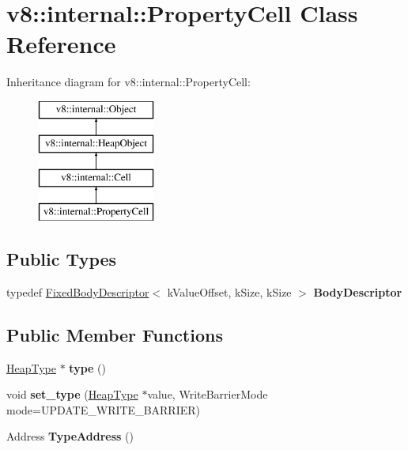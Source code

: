 \hypertarget{classv8_1_1internal_1_1_property_cell}{}\section{v8\+:\+:internal\+:\+:Property\+Cell Class Reference}
\label{classv8_1_1internal_1_1_property_cell}
Inheritance diagram for v8\+:\+:internal\+:\+:Property\+Cell\+:\begin{figure}[H]
\begin{center}
\leavevmode
\includegraphics[height=4.000000cm]{classv8_1_1internal_1_1_property_cell}
\end{center}
\end{figure}
\subsection*{Public Types}
\begin{DoxyCompactItemize}
\item 
\hypertarget{classv8_1_1internal_1_1_property_cell_aa261f74f109f9706cc80a50fcf3fea83}{}typedef \hyperlink{classv8_1_1internal_1_1_fixed_body_descriptor}{Fixed\+Body\+Descriptor}$<$ k\+Value\+Offset, k\+Size, k\+Size $>$ {\bfseries Body\+Descriptor}\label{classv8_1_1internal_1_1_property_cell_aa261f74f109f9706cc80a50fcf3fea83}

\end{DoxyCompactItemize}
\subsection*{Public Member Functions}
\begin{DoxyCompactItemize}
\item 
\hypertarget{classv8_1_1internal_1_1_property_cell_aae274db0398e63351fb9b2a09187b0d4}{}\hyperlink{classv8_1_1internal_1_1_type_impl}{Heap\+Type} $\ast$ {\bfseries type} ()\label{classv8_1_1internal_1_1_property_cell_aae274db0398e63351fb9b2a09187b0d4}

\item 
\hypertarget{classv8_1_1internal_1_1_property_cell_a3583607fe9599b791b6ff4d3287a06f7}{}void {\bfseries set\+\_\+type} (\hyperlink{classv8_1_1internal_1_1_type_impl}{Heap\+Type} $\ast$value, Write\+Barrier\+Mode mode=U\+P\+D\+A\+T\+E\+\_\+\+W\+R\+I\+T\+E\+\_\+\+B\+A\+R\+R\+I\+E\+R)\label{classv8_1_1internal_1_1_property_cell_a3583607fe9599b791b6ff4d3287a06f7}

\item 
\hypertarget{classv8_1_1internal_1_1_property_cell_a6a7a52102001cdef5f4c0fc1652b87e5}{}Address {\bfseries Type\+Address} ()\label{classv8_1_1internal_1_1_property_cell_a6a7a52102001cdef5f4c0fc1652b87e5}

\end{DoxyCompactItemize}
